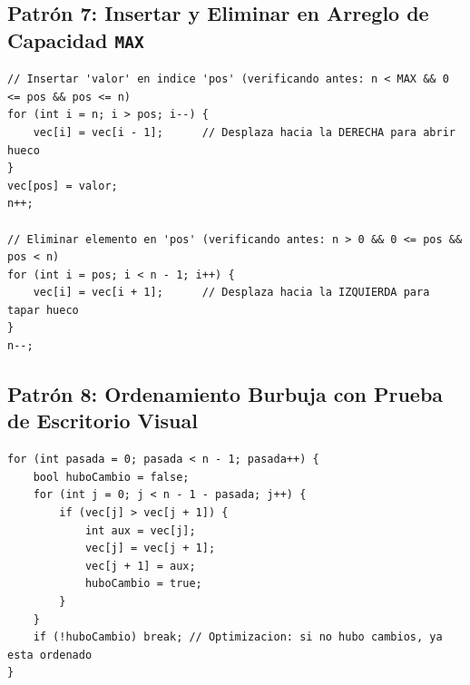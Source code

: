 \documentclass[11pt,letterpaper]{article}
\begin{document}
\subsection{Patrón 7: Insertar y Eliminar en Arreglo de Capacidad \texttt{MAX}}
\begin{lstlisting}[style=cppmonitoria]
// Insertar 'valor' en indice 'pos' (verificando antes: n < MAX && 0 <= pos && pos <= n)
for (int i = n; i > pos; i--) {
    vec[i] = vec[i - 1];      // Desplaza hacia la DERECHA para abrir hueco
}
vec[pos] = valor;
n++;

// Eliminar elemento en 'pos' (verificando antes: n > 0 && 0 <= pos && pos < n)
for (int i = pos; i < n - 1; i++) {
    vec[i] = vec[i + 1];      // Desplaza hacia la IZQUIERDA para tapar hueco
}
n--;
\end{lstlisting}

\begin{center}
\end{center}

\subsection{Patrón 8: Ordenamiento Burbuja con Prueba de Escritorio Visual}
\begin{lstlisting}[style=cppmonitoria]
for (int pasada = 0; pasada < n - 1; pasada++) {
    bool huboCambio = false;
    for (int j = 0; j < n - 1 - pasada; j++) {
        if (vec[j] > vec[j + 1]) {
            int aux = vec[j];
            vec[j] = vec[j + 1];
            vec[j + 1] = aux;
            huboCambio = true;
        }
    }
    if (!huboCambio) break; // Optimizacion: si no hubo cambios, ya esta ordenado
}
\end{lstlisting}
\end{document}
